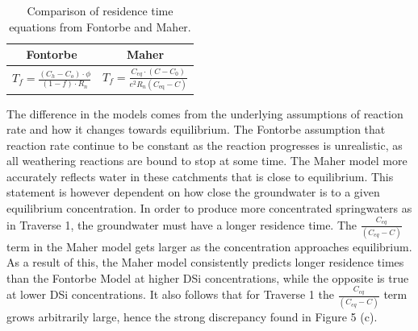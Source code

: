 \begin{table}[h]
    \centering
    \renewcommand{\arraystretch}{2.2} %
    \begin{tabular}{cc}
        \toprule
        \textbf{Fontorbe} & \textbf{Maher} \\
        \midrule
        $\displaystyle T_f  = \frac{\left(C_h - C_o\right)\cdot\phi}{\left(1-f\right)\cdot R_n}$ & 
        $\displaystyle T_f = \frac{C_{eq} \cdot \left(C - C_0\right)}{e^2 R_n \left( C_{\text{eq}} - C \right)}$ \\ [10pt]
        \bottomrule
    \end{tabular}
    \caption{Comparison of residence time equations from Fontorbe and Maher.}
    \label{tab:equations}
\end{table}

The difference in the models comes from the underlying assumptions of reaction rate and how it changes towards equilibrium. The Fontorbe assumption that reaction rate continue to be constant as the reaction progresses is unrealistic, as all weathering reactions are bound to stop at some time. The Maher model more accurately reflects water in these catchments that is close to equilibrium. This statement is however dependent on how close the groundwater is to a given equilibrium concentration. In order to produce more concentrated springwaters as in Traverse 1, the groundwater must have a longer residence time. The $\frac{C_{eq}}{(C_{eq} - C)}$ term in the Maher model gets larger as the concentration approaches equilibrium. As a result of this, the Maher model consistently predicts longer residence times than the Fontorbe Model at higher DSi concentrations, while the opposite is true at lower DSi concentrations. It also follows that for Traverse 1 the $\frac{C_{eq}}{(C_{eq} - C)}$ term grows arbitrarily large, hence the strong discrepancy found in Figure 5 (c).

\bsk

